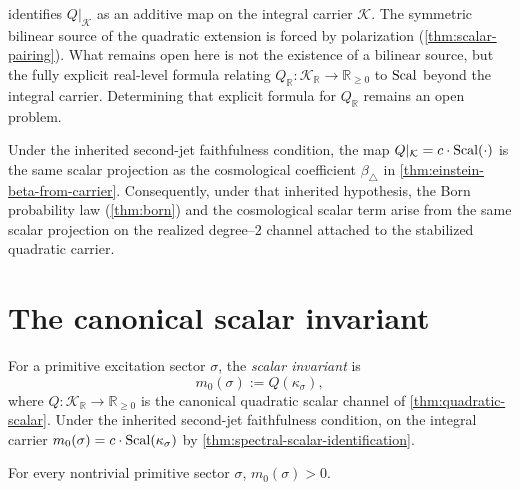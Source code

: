 \begin{remark}
\label{rem:spectral-scalar-id-scope}
 identifies $Q|_{\mathcal K}$
as an additive map on the integral carrier $\mathcal K$.
The symmetric bilinear source of the quadratic extension is forced by
polarization (\cref{thm:scalar-pairing}).  What remains open here is not
the existence of a bilinear source, but the fully explicit real-level formula
relating
$Q_{\mathbb R} : \mathcal K_{\mathbb R} \to \mathbb R_{\geq 0}$
to $\operatorname{Scal}$ beyond the integral carrier.  Determining that explicit formula
for $Q_{\mathbb R}$ remains an open problem.
\end{remark}

\begin{remark}
\label{rem:spectral-cosmological}
Under the inherited second-jet faithfulness condition, the map
$Q|_{\mathcal K} = c \cdot \operatorname{Scal}(\cdot)$
is the same scalar projection as the cosmological coefficient
$\beta_\triangle$ in \cref{thm:einstein-beta-from-carrier}.
Consequently, under that inherited hypothesis, the Born probability
law (\cref{thm:born}) and the cosmological scalar term arise from the
same scalar projection on the realized degree--\(2\) channel attached
to the stabilized quadratic carrier.
\end{remark}

\section{The canonical scalar invariant}
\label{sec:spectral-scalar}

\begin{definition}
\label{def:spectral-scalar}
For a primitive excitation sector $\sigma$, the \emph{scalar invariant} is
\[
  m_0(\sigma) := Q(\kappa_\sigma),
\]
where $Q : \mathcal K_{\mathbb R} \to \mathbb R_{\geq 0}$ is the
canonical quadratic scalar channel of \cref{thm:quadratic-scalar}.
Under the inherited second-jet faithfulness condition, on the integral
carrier
$m_0(\sigma) = c \cdot \operatorname{Scal}(\kappa_\sigma)$
by \cref{thm:spectral-scalar-identification}.
\end{definition}

\begin{theorem}
\label{thm:spectral-scalar-positive}
For every nontrivial primitive sector $\sigma$, $m_0(\sigma) > 0$.
\end{theorem}

